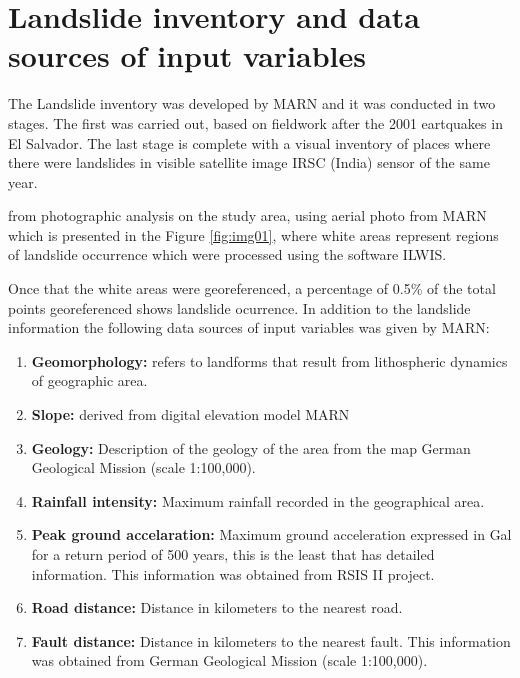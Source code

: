 \documentclass[11pt,twoside]{rmta2010esp}%
\begin{document}
\section{Landslide inventory and data sources of input variables}
\label{sec:landsinvet}
The Landslide inventory was developed by MARN and it was conducted in two stages. The first was carried out, based on fieldwork after the 2001 eartquakes in El Salvador. The last stage is complete with a visual inventory of places where there were landslides in visible satellite image IRSC (India) sensor of the same year.


from photographic analysis on the study area, using aerial photo from MARN which is presented in the Figure \ref{fig:img01}, where white areas represent regions of landslide occurrence which were processed using the software ILWIS. 


Once that the white areas were georeferenced, a percentage of 0.5\% of the total points georeferenced shows landslide ocurrence. In addition to the landslide information the following data sources of input variables was given by MARN: 
\begin{enumerate}
\item {\bf Geomorphology:} refers to landforms that result from lithospheric dynamics of geographic area.

\item {\bf Slope:} derived from digital elevation model MARN

\item {\bf Geology:} Description of the geology of the area from the map German Geological Mission (scale 1:100,000).

\item {\bf Rainfall intensity:} Maximum rainfall recorded in the geographical area.

\item {\bf Peak ground accelaration:} Maximum ground acceleration expressed in Gal for a return period of 500 years, this is the least that has detailed information. This information was obtained from RSIS II project.

\item {\bf Road distance:} Distance in kilometers to the nearest road. 

\item {\bf Fault distance:} Distance in kilometers to the nearest fault. This information was obtained from German Geological Mission (scale 1:100,000). 
 
\end{enumerate}
\end{document}
